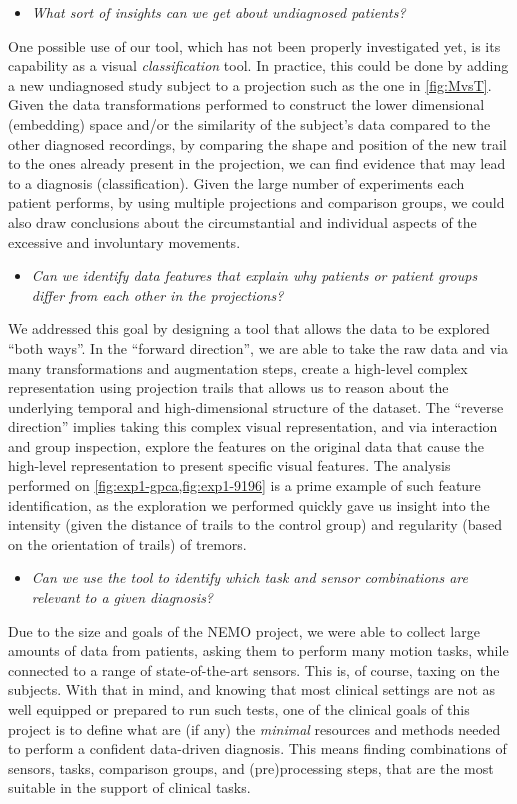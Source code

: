 \begin{itemize}
    \item \emph{What sort of insights can we get about undiagnosed patients?}
\end{itemize}
%
One possible use of our tool, which has not been properly investigated yet, is its capability as a visual \emph{classification} tool. In practice, this could be done by adding a new undiagnosed study subject to a projection such as the one in \cref{fig:MvsT}. Given the data transformations performed to construct the lower dimensional (embedding) space and/or the similarity of the subject's data compared to the other diagnosed recordings, by comparing the shape and position of the new trail to the ones already present in the projection,  we can find evidence that may lead to a diagnosis (classification). Given the large number of experiments each patient performs, by using multiple projections and comparison groups, we could also draw conclusions about the circumstantial and individual aspects of the excessive and involuntary movements.

\begin{itemize}
    \item \emph{Can we identify data features that explain why patients or patient groups differ from each other in the projections?}
\end{itemize}
We addressed this goal by designing a tool that allows the data to be explored ``both ways''. In the ``forward direction'', we are able to take the raw data and via many transformations and augmentation steps, create a high-level complex representation using projection trails that allows us to reason about the underlying temporal and high-dimensional structure of the dataset. The ``reverse direction'' implies taking this complex visual representation, and via interaction and group inspection, explore the features on the original data that cause the high-level representation to present specific visual features.
The analysis performed on \cref{fig:exp1-gpca,fig:exp1-9196} is a prime example of such feature identification, as the exploration we performed quickly gave us insight into the intensity (given the distance of trails to the control group) and regularity (based on the orientation of trails) of tremors.


\begin{itemize}
    \item \emph{Can we use the tool to identify which task and sensor combinations are relevant to a given diagnosis?}
\end{itemize}
Due to the size and goals of the NEMO project, we were able to collect large amounts of data from patients, asking them to perform many motion tasks, while connected to a range of state-of-the-art sensors. This is, of course, taxing on the subjects. With that in mind, and knowing that most clinical settings are not as well equipped or prepared to run such tests, one of the clinical goals of this project is to define what are (if any) the \emph{minimal} resources and methods needed to perform a confident data-driven diagnosis. This means finding combinations of sensors, tasks, comparison groups, and (pre)processing steps, that are the most suitable in the support of clinical tasks. 

